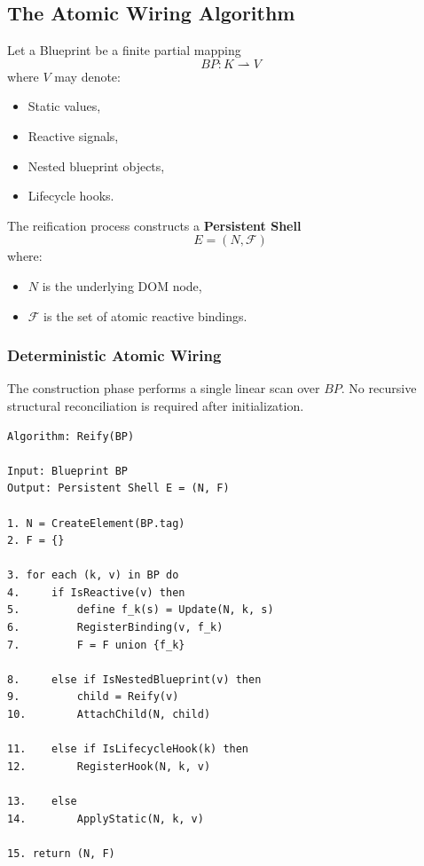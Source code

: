 \subsection{The Atomic Wiring Algorithm}

Let a Blueprint be a finite partial mapping
\[
BP : K \rightharpoonup V
\]
where $V$ may denote:
\begin{itemize}
    \item Static values,
    \item Reactive signals,
    \item Nested blueprint objects,
    \item Lifecycle hooks.
\end{itemize}

The reification process constructs a \textbf{Persistent Shell}
\[
E = (N, \mathcal{F})
\]
where:
\begin{itemize}
    \item $N$ is the underlying DOM node,
    \item $\mathcal{F}$ is the set of atomic reactive bindings.
\end{itemize}

\subsubsection*{Deterministic Atomic Wiring}

The construction phase performs a single linear scan over $BP$.
No recursive structural reconciliation is required after initialization.

\begin{lstlisting}[caption={Deterministic Atomic Wiring Algorithm}]
Algorithm: Reify(BP)

Input: Blueprint BP
Output: Persistent Shell E = (N, F)

1. N = CreateElement(BP.tag)
2. F = {}

3. for each (k, v) in BP do
4.     if IsReactive(v) then
5.         define f_k(s) = Update(N, k, s)
6.         RegisterBinding(v, f_k)
7.         F = F union {f_k}

8.     else if IsNestedBlueprint(v) then
9.         child = Reify(v)
10.        AttachChild(N, child)

11.    else if IsLifecycleHook(k) then
12.        RegisterHook(N, k, v)

13.    else
14.        ApplyStatic(N, k, v)

15. return (N, F)
\end{lstlisting}

